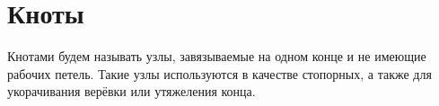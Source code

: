 \chapter{Кноты}
Кнотами будем называть узлы, завязываемые на одном конце и не имеющие рабочих петель. Такие узлы используются в качестве стопорных, а также для укорачивания верёвки или утяжеления конца.

